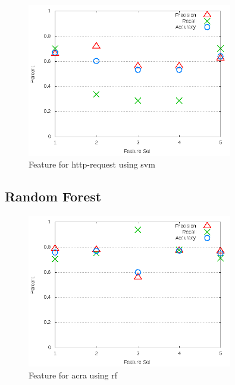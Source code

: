 \begin{figure}[!t]
\centering
\includegraphics[width=0.8\textwidth]{images/svm/test_3/http-request_sample_range.png}
\caption{Feature for http-request using \gls{svm}}
\label{fig:test_3_http-request_svm}
\end{figure}

\subsection{Random Forest}
\label{app_sub:experiment_2_rf}

\begin{figure}
\centering
\includegraphics[width=0.8\textwidth]{images/rf/test_3/acra_sample_range.png}
\caption{Feature for acra using \gls{rf}}
\label{fig:test_3_acra_rf}
\end{figure}


